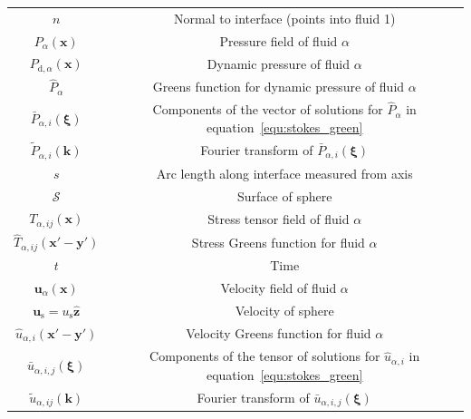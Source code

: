 \documentclass[12pt]{article}
\begin{document}
\begin{longtable}{|c|c|}
    $n$                                                                           & Normal to interface (points into fluid 1) \\
    $P_{\alpha}(\boldsymbol{x})$                                                    & Pressure field of fluid $\alpha$ \\
    $P_{\text{d},\alpha}(\boldsymbol{x}) $                                            & Dynamic pressure of fluid $\alpha$ \\
    $\hat{P}_{\alpha}$                                                       & Greens function for dynamic pressure of fluid $\alpha$ \\
    $\bar{P}_{\alpha, i}(\boldsymbol{\xi})$                                            & Components of the vector of solutions for $\hat{P}_{\alpha}$ in equation~\ref{equ:stokes_green} \\
    $\tilde{P}_{\alpha, i} (\boldsymbol{k})$                                         & Fourier transform of $\bar{P}_{\alpha, i}(\boldsymbol{\xi})$ \\
    $s$                                                                           & Arc length along interface measured from axis \\
    $\mathcal{S}$                                                                 & Surface of sphere \\
    $T_{\alpha,ij}(\boldsymbol{x})$                                                  & Stress tensor field of fluid $\alpha$ \\
    $\hat{T}_{\alpha,ij}(\boldsymbol{x'} - \boldsymbol{y'})$                         & Stress Greens function for fluid $\alpha$ \\
    $t$                                                                           & Time \\
    $\boldsymbol{u}_{\alpha}(\boldsymbol{x})$                                       & Velocity field of fluid $\alpha$ \\
    $\boldsymbol{u}_{\text{s}} = u_{\text{s}} \boldsymbol{\hat{z}}$                    & Velocity of sphere \\
    $\hat{u}_{\alpha,i}(\boldsymbol{x'} - \boldsymbol{y'})$                         & Velocity Greens function for fluid $\alpha$ \\
    $\bar{u}_{\alpha, i,j}(\boldsymbol{\xi})$                                        & Components of the tensor of solutions for $\hat{u}_{\alpha,i}$ in equation~\ref{equ:stokes_green} \\
    $\tilde{u}_{\alpha, ij}(\boldsymbol{k})$                                         & Fourier transform of $\bar{u}_{\alpha, i,j}(\boldsymbol{\xi})$ \\

\end{longtable}
\end{document}
